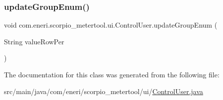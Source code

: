 \subsubsection{\texorpdfstring{update\+Group\+Enum()}{updateGroupEnum()}}
{\footnotesize\ttfamily void com.\+eneri.\+scorpio\+\_\+metertool.\+ui.\+Control\+User.\+update\+Group\+Enum (\begin{DoxyParamCaption}\item[{String}]{value\+Row\+Per }\end{DoxyParamCaption})}



The documentation for this class was generated from the following file\+:\begin{DoxyCompactItemize}
\item 
src/main/java/com/eneri/scorpio\+\_\+metertool/ui/\hyperlink{_control_user_8java}{Control\+User.\+java}\end{DoxyCompactItemize}
